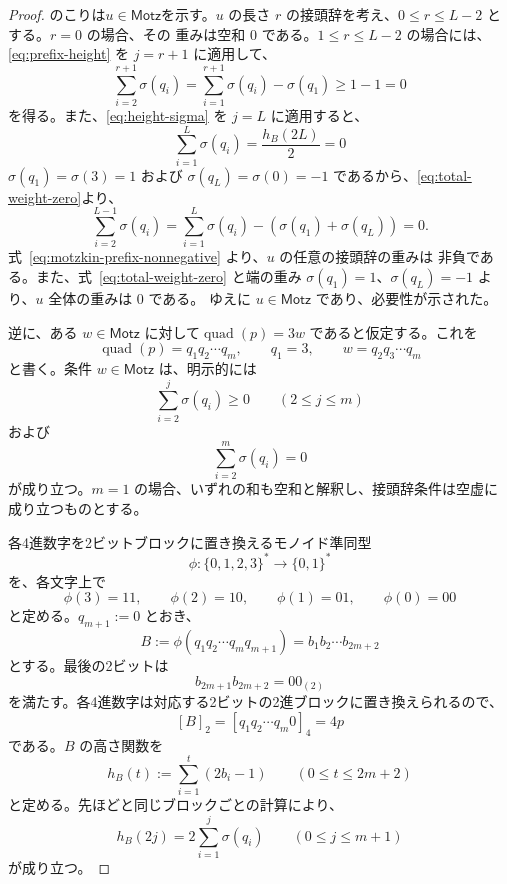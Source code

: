 \documentclass[12pt]{ltjsarticle}
\theoremstyle{plain}
\theoremstyle{definition}
\theoremstyle{plain}
\begin{document}
\begin{proof}
のこりは$u\in\mathsf{Motz}$を示す。$u$ の長さ $r$ の接頭辞を考え、$0\leq r\leq L-2$ とする。$r=0$ の場合、その
重みは空和 $0$ である。$1\leq r\leq L-2$ の場合には、
\eqref{eq:prefix-height} を $j=r+1$ に適用して、
\begin{equation}\label{eq:motzkin-prefix-nonnegative}
 \sum_{i=2}^{r+1}\sigma(q_i)
 =\sum_{i=1}^{r+1}\sigma(q_i)-\sigma(q_1)
 \geq1-1=0
\end{equation}
を得る。また、\eqref{eq:height-sigma} を $j=L$ に適用すると、
\begin{equation}\label{eq:total-weight-zero}
 \sum_{i=1}^{L}\sigma(q_i)
 =\frac{h_B(2L)}{2}
 =0
\end{equation}
$\sigma(q_1)=\sigma(3)=1$ および $\sigma(q_L)=\sigma(0)=-1$ であるから、\eqref{eq:total-weight-zero}より、
\[
 \sum_{i=2}^{L-1}\sigma(q_i)= \sum_{i=1}^{L}\sigma(q_i)-(\sigma(q_1)+\sigma(q_L))=0.
\]
式~\eqref{eq:motzkin-prefix-nonnegative} より、$u$ の任意の接頭辞の重みは
非負である。また、式~\eqref{eq:total-weight-zero} と端の重み
$\sigma(q_1)=1$、$\sigma(q_L)=-1$ より、$u$ 全体の重みは $0$ である。
ゆえに $u\in\mathsf{Motz}$ であり、必要性が示された。

逆に、ある $w\in\mathsf{Motz}$ に対して$ \operatorname{quad}(p)=3w$
であると仮定する。これを
\[
 \operatorname{quad}(p)=q_1q_2\cdots q_m,
 \qquad
 q_1=3,
 \qquad
 w=q_2q_3\cdots q_m
\]
と書く。条件 $w\in\mathsf{Motz}$ は、明示的には
\begin{equation}\label{eq:reverse-motzkin-prefix}
 \sum_{i=2}^{j}\sigma(q_i)\geq0
 \qquad(2\leq j\leq m)
\end{equation}
および
\begin{equation}\label{eq:reverse-motzkin-total}
 \sum_{i=2}^{m}\sigma(q_i)=0
\end{equation}
が成り立つ。$m=1$ の場合、いずれの和も空和と解釈し、接頭辞条件は空虚に
成り立つものとする。

各4進数字を2ビットブロックに置き換えるモノイド準同型
\[
 \phi:\{0,1,2,3\}^*\longrightarrow\{0,1\}^*
\]
を、各文字上で
\[
 \phi(3)=11,\qquad
 \phi(2)=10,\qquad
 \phi(1)=01,\qquad
 \phi(0)=00
\]
と定める。$q_{m+1}:=0$ とおき、
\[
 B:=\phi(q_1q_2\cdots q_mq_{m+1})
   =b_1b_2\cdots b_{2m+2}
\]
とする。最後の2ビットは
\[
 b_{2m+1}b_{2m+2}=00_{(2)}
\]
を満たす。各4進数字は対応する2ビットの2進ブロックに置き換えられるので、
\begin{equation}\label{eq:block-value}
 [B]_2=[q_1q_2\cdots q_m0]_4=4p
\end{equation}
である。$B$ の高さ関数を
\[
 h_B(t):=\sum_{i=1}^{t}(2b_i-1)
 \qquad(0\leq t\leq2m+2)
\]
と定める。先ほどと同じブロックごとの計算により、
\begin{equation}\label{eq:reverse-height-sigma}
 h_B(2j)=2\sum_{i=1}^{j}\sigma(q_i)
 \qquad(0\leq j\leq m+1)
\end{equation}
が成り立つ。


\end{proof}
\end{document}
